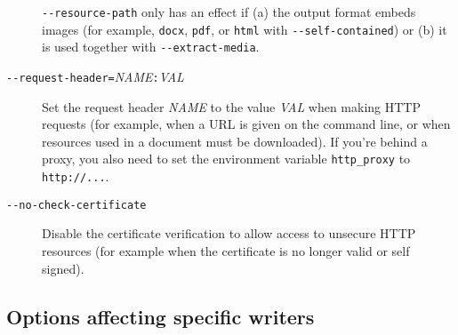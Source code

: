 \documentclass[]{article}
\begin{document}
\begin{description}
\texttt{-\/-resource-path} only has an effect if (a) the output format
embeds images (for example, \texttt{docx}, \texttt{pdf}, or
\texttt{html} with \texttt{-\/-self-contained}) or (b) it is used
together with \texttt{-\/-extract-media}.
\item[\texttt{-\/-request-header=}\emph{NAME}\texttt{:}\emph{VAL}]
Set the request header \emph{NAME} to the value \emph{VAL} when making
HTTP requests (for example, when a URL is given on the command line, or
when resources used in a document must be downloaded). If you're behind
a proxy, you also need to set the environment variable
\texttt{http\_proxy} to \texttt{http://...}.
\item[\texttt{-\/-no-check-certificate}]
Disable the certificate verification to allow access to unsecure HTTP
resources (for example when the certificate is no longer valid or self
signed).
\end{description}

\hypertarget{options-affecting-specific-writers}{%
\subsection{Options affecting specific
writers}\label{options-affecting-specific-writers}}
\end{document}
